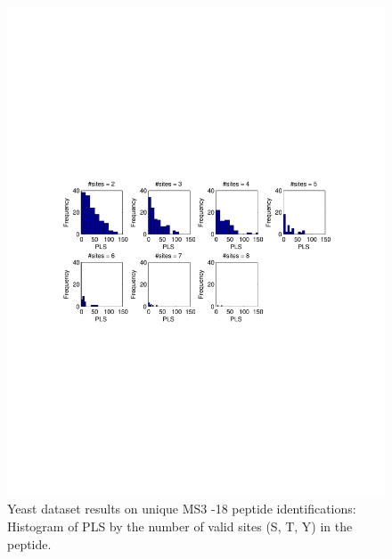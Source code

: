 \begin{figure}[htbp]
\centering %
\includegraphics[trim = 0mm 90mm 20mm 90mm,clip,width=\textwidth]{fig/phospho/uniqueIds/PLS_figs/uniqIds_PLS_hist_by_num_valid_sites.pdf}
\caption{Yeast dataset results on unique MS3 -18 peptide identifications: Histogram of PLS by the number of valid sites (S, T, Y) in the peptide.}
\label{fig:yeast_pls}
\end{figure}

